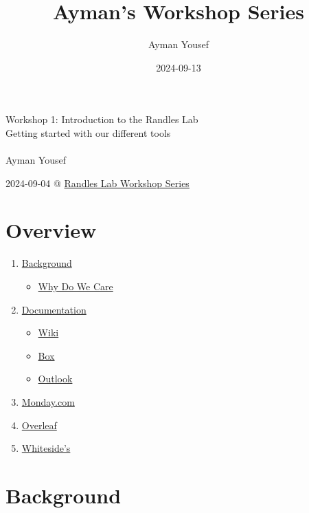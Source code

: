 \documentclass[
  letterpaper,
  DIV=11,
  numbers=noendperiod]{scrartcl}
\title{Ayman's Workshop Series}
\author{Ayman Yousef}
\date{2024-09-13}
\providecommand{\tightlist}{%
  \setlength{\itemsep}{0pt}\setlength{\parskip}{0pt}}\usepackage{longtable,booktabs,array}
\begin{document}
\maketitle


\section{}\label{section}

{Workshop 1: Introduction to the Randles Lab}\\
{Getting started with our different tools}\\
{~}\\
\href{https://aymanzyy.github.io}{} {Ayman Yousef }

{2024-09-04 @ \href{https://randleslab.pratt.duke.edu}{Randles Lab
Workshop Series}}

\section{Overview}\label{overview}

\begin{enumerate}
\def\labelenumi{\arabic{enumi}.}
\tightlist
\item
  \hyperref[background]{Background}

  \begin{itemize}
  \tightlist
  \item
    \hyperref[wecare]{Why Do We Care}
  \end{itemize}
\item
  \hyperref[documentation]{Documentation}

  \begin{itemize}
  \tightlist
  \item
    \hyperref[wiki]{Wiki}
  \item
    \hyperref[box]{Box}
  \item
    \hyperref[outlook]{Outlook}
  \end{itemize}
\item
  \hyperref[monday]{Monday.com}
\item
  \hyperref[overleaf]{Overleaf}
\item
  \hyperref[whitesides]{Whiteside's}
\end{enumerate}

\section{Background}\label{background}
\end{document}

